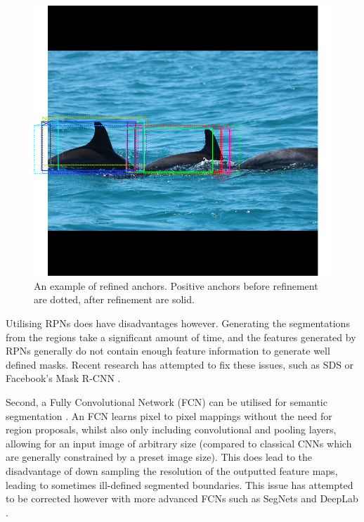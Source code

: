 \begin{figure}
	\begin{center}
		\includegraphics[scale=0.3]{Chapter2/figs/rpn-refined.png}
	\end{center}
	\caption{An example of refined anchors. Positive anchors before refinement are dotted, after refinement are solid.}
	\label{fig:rpn-refined}
\end{figure}

Utilising RPNs does have disadvantages however. Generating the segmentations from the regions take a significant amount of time, and the features generated by RPNs generally do not contain enough feature information to generate well defined masks. Recent research has attempted to fix these issues, such as SDS \cite{hariharan_simultaneous_2014} or Facebook's Mask R-CNN \cite{he_mask_2017}.

Second, a Fully Convolutional Network (FCN) can be utilised for semantic segmentation \cite{long_fully_2014}. An FCN learns pixel to pixel mappings without the need for region proposals, whilst also only including convolutional and pooling layers, allowing for an input image of arbitrary size (compared to classical CNNs which are generally constrained by a preset image size). This does lead to the disadvantage of down sampling the resolution of the outputted feature maps, leading to sometimes ill-defined segmented boundaries. This issue has attempted to be corrected however with more advanced FCNs such as SegNets \cite{badrinarayanan_segnet:_2015} and DeepLab \cite{chen_semantic_2014}. 

